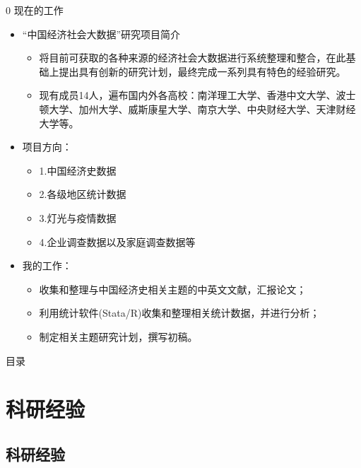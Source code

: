 \documentclass{beamer}%
\begin{document}
\begin{frame}[t]{0 现在的工作}
\begin{itemize}
  \item “中国经济社会大数据”研究项目简介
  \begin{itemize}
    \item 将目前可获取的各种来源的经济社会大数据进行系统整理和整合，在此基础上提出具有创新的研究计划，最终完成一系列具有特色的经验研究。
    \item 现有成员14人，遍布国内外各高校：南洋理工大学、香港中文大学、波士顿大学、加州大学、威斯康星大学、南京大学、中央财经大学、天津财经大学等。
  \end{itemize}
  \item 项目方向：
  \begin{itemize}
   \item 1.中国经济史数据
   \item 2.各级地区统计数据
   \item 3.灯光与疫情数据
   \item 4.企业调查数据以及家庭调查数据等
  \end{itemize}
  \item 我的工作：
  \begin{itemize}
    \item 收集和整理与中国经济史相关主题的中英文文献，汇报论文；
    \item 利用统计软件(Stata/R)收集和整理相关统计数据，并进行分析；
    \item 制定相关主题研究计划，撰写初稿。
  \end{itemize}
\end{itemize}
\end{frame}


\begin{frame}[t]{目录}
\tableofcontents  %
\end{frame}
	

\section{科研经验}  %
\subsection*{科研经验}
\end{document}
